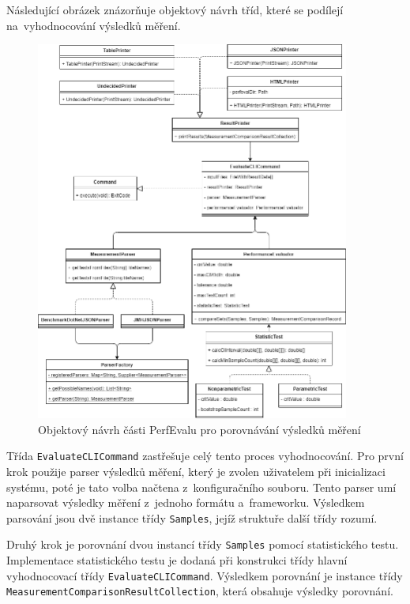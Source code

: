 Následující obrázek znázorňuje objektový návrh tříd, které se podílejí na~vyhodnocování výsledků měření.

\begin{figure}[!ht]
    \centering
    \includegraphics[width=0.92\textwidth]{../img/perfeval_evaluate.png}
    \caption{Objektový návrh části PerfEvalu pro porovnávání výsledků měření}
\end{figure}

Třída \lstinline|EvaluateCLICommand| zastřešuje celý tento proces vyhodnocování.
Pro první krok použije parser výsledků měření, který je zvolen uživatelem při inicializaci systému,
poté je tato volba načtena z~konfiguračního souboru. Tento parser umí naparsovat výsledky měření
z~jednoho formátu a~frameworku. Výsledkem parsování jsou dvě instance třídy \lstinline|Samples|,
jejíž struktuře další třídy rozumí.

Druhý krok je porovnání dvou instancí třídy \lstinline|Samples| pomocí statistického testu.
Implementace statistického testu je dodaná při konstrukci třídy hlavní vyhodnocovací třídy \lstinline|EvaluateCLICommand|.
Výsledkem porovnání je instance třídy \lstinline|MeasurementComparisonResultCollection|, která obsahuje výsledky porovnání.

